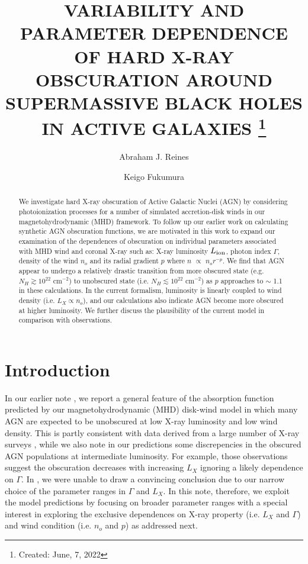 \documentclass[12pt,preprint]{aastex631}
\begin{document}
\title{VARIABILITY AND PARAMETER DEPENDENCE OF HARD X-RAY OBSCURATION AROUND SUPERMASSIVE BLACK HOLES IN ACTIVE GALAXIES
\footnote{Created: June, 7, 2022}}

\author[0000-0002-0786-7307]{Abraham J. Reines}
\author[0000-0002-0786-7307]{Keigo Fukumura}

\begin{abstract}

We investigate hard X-ray obscuration of Active Galactic Nuclei (AGN) by considering photoionization processes for a number of simulated accretion-disk winds in our magnetohydrodynamic (MHD) framework. To follow up our earlier work on calculating synthetic AGN obscuration functions, we are motivated in this work to expand our examination of the dependences of obscuration on individual parameters associated with MHD wind and coronal X-ray such as: X-ray luminosity $L_{\rm ion}$, photon index $\Gamma$, density of the wind $n_o$ and its radial gradient $p$ where $n$ $\propto$ $n_o r^{-p}$.  We find that AGN appear to undergo a relatively drastic transition from more obscured state (e.g. $N_H \gtrsim 10^{22}$ cm$^{-2}$) to unobscured state (i.e. $N_H \lesssim 10^{22}$ cm$^{-2}$) as $p$ approaches to $\sim$ 1.1 in these calculations. In the current formalism, luminosity is linearly coupled to wind density (i.e. $L_X \propto n_o$), and our calculations also indicate AGN become more obscured at higher luminosity. We further discuss the plausibility of the current model in comparison with observations.

\end{abstract}



\section{Introduction}

In our earlier note \citep{Reines22}, we report a general feature of the absorption function predicted by our magnetohydrodynamic (MHD) disk-wind model \citep[e.g.][]{F10} in which many AGN are expected to be unobscured at low X-ray luminosity and low wind density. This is partly consistent with data derived from a large number of X-ray surveys \citep[e.g.][]{Ueda03,Buchner15}, while we also note in our predictions some discrepencies in the obscured AGN populations at intermediate luminosity. For example, those observations suggest the obscuration decreases with increasing $L_X$ ignoring a likely dependence on $\Gamma$. In \cite{Reines22}, we were unable to draw a convincing conclusion due to our narrow choice of the parameter ranges in $\Gamma$ and $L_X$.  In this note, therefore, we exploit the model predictions by focusing on broader parameter ranges with a special interest in exploring the exclusive dependences on X-ray property (i.e. $L_X$ and $\Gamma$) and wind condition (i.e. $n_o$ and $p$) as addressed next.  
\end{document}
